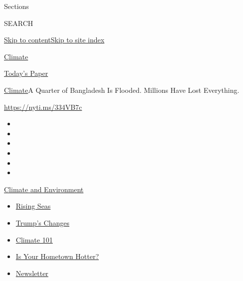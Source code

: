 Sections

SEARCH

\protect\hyperlink{site-content}{Skip to
content}\protect\hyperlink{site-index}{Skip to site index}

\href{https://www.nytimes3xbfgragh.onion/section/climate}{Climate}

\href{https://myaccount.nytimes3xbfgragh.onion/auth/login?response_type=cookie\&client_id=vi}{}

\href{https://www.nytimes3xbfgragh.onion/section/todayspaper}{Today's
Paper}

\href{/section/climate}{Climate}\textbar{}A Quarter of Bangladesh Is
Flooded. Millions Have Lost Everything.

\url{https://nyti.ms/334VB7c}

\begin{itemize}
\item
\item
\item
\item
\item
\item
\end{itemize}

\href{https://www.nytimes3xbfgragh.onion/section/climate?action=click\&pgtype=Article\&state=default\&region=TOP_BANNER\&context=storylines_menu}{Climate
and Environment}

\begin{itemize}
\tightlist
\item
  \href{https://www.nytimes3xbfgragh.onion/2020/07/30/climate/sea-level-inland-floods.html?action=click\&pgtype=Article\&state=default\&region=TOP_BANNER\&context=storylines_menu}{Rising
  Seas}
\item
  \href{https://www.nytimes3xbfgragh.onion/interactive/2020/climate/trump-environment-rollbacks.html?action=click\&pgtype=Article\&state=default\&region=TOP_BANNER\&context=storylines_menu}{Trump's
  Changes}
\item
  \href{https://www.nytimes3xbfgragh.onion/interactive/2020/04/19/climate/climate-crash-course-1.html?action=click\&pgtype=Article\&state=default\&region=TOP_BANNER\&context=storylines_menu}{Climate
  101}
\item
  \href{https://www.nytimes3xbfgragh.onion/interactive/2018/08/30/climate/how-much-hotter-is-your-hometown.html?action=click\&pgtype=Article\&state=default\&region=TOP_BANNER\&context=storylines_menu}{Is
  Your Hometown Hotter?}
\item
  \href{https://www.nytimes3xbfgragh.onion/newsletters/climate-change?action=click\&pgtype=Article\&state=default\&region=TOP_BANNER\&context=storylines_menu}{Newsletter}
\end{itemize}

